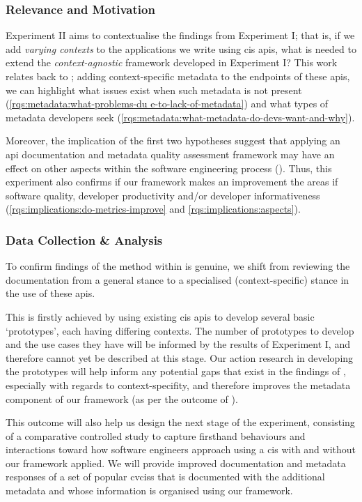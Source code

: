 \subsubsection{Relevance and Motivation}

Experiment II aims to contextualise the findings from Experiment I; that is, if we add \textit{varying contexts} to the applications we write using \gls{cis} \glspl{api}, what is needed to extend the \textit{context-agnostic} framework developed in Experiment I? This work relates back to ; adding context-specific metadata to the endpoints of these \glspl{api}, we can highlight what issues exist when such metadata is not present (\ref{rqs:metadata:what-problems-du                                                                e-to-lack-of-metadata}) and what types of metadata developers seek (\ref{rqs:metadata:what-metadata-do-devs-want-and-why}).

Moreover, the implication of the first two hypotheses suggest that applying an \gls{api} documentation and metadata quality assessment framework may have an effect on other aspects within the software engineering process (). Thus, this experiment also confirms if our framework makes an improvement the areas if software quality, developer productivity and/or developer informativeness (\ref{rqs:implications:do-metrics-improve} and \ref{rqs:implications:aspects}).

\subsubsection{Data Collection \& Analysis}

To confirm findings of the method within  is genuine, we shift from reviewing the documentation from a general stance to a specialised (context-specific) stance in the use of these \glspl{api}.

This is firstly achieved by using existing \gls{cis} \glspl{api} to develop several basic `prototypes', each having differing contexts. The number of prototypes to develop and the use cases they have will be informed by the results of Experiment I, and therefore cannot yet be described at this stage. Our action research in developing the prototypes will help inform any potential gaps that exist in the findings of , especially with regards to context-specifity, and therefore improves the metadata component of our framework (as per the outcome of ). 

This outcome will also help us design the next stage of the experiment, consisting of a comparative controlled study \citep{Seaman:2007wa} to capture firsthand behaviours and interactions toward how software engineers approach using a \gls{cis} with and without our framework applied. We will provide improved documentation and metadata responses of a set of popular \glspl{cvcis} that is documented with the additional metadata and whose information is organised using our framework. 

